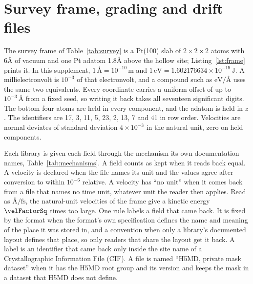 \documentclass[preprint,12pt]{elsarticle}
\begin{document}
\FloatBarrier \section{Survey frame, grading and drift files}\label{sec:supp-failure} The survey frame of Table~\ref{tab:survey} is a Pt(100) slab of \(2\times2\times2\) atoms with 6\hspace*{.2em}\AA{} of vacuum and one Pt adatom 1.8\hspace*{.2em}\AA{} above the hollow site; Listing~\ref{lst:frame} prints it.
In this supplement, \(1\,\text{\AA}=10^{-10}\,\mathrm{m}\) and \(1\,\mathrm{eV}=1.602176634\times10^{-19}\,\mathrm{J}\).
A millielectronvolt is \(10^{-3}\) of that electronvolt, and a compound such as \(\mathrm{eV}/\text{\AA}\) uses the same two equivalents.
Every coordinate carries a uniform offset of up to \(10^{-3}\,\text{\AA}\) from a fixed seed, so writing it back takes all seventeen significant digits.
The bottom four atoms are held in every component, and the adatom is held in \(z\).
The identifiers are 17, 3, 11, 5, 23, 2, 13, 7 and 41 in row order.
Velocities are normal deviates of standard deviation \(4\times10^{-3}\) in the natural unit, zero on held components.

Each library is given each field through the mechanism its own documentation names, Table~\ref{tab:mechanisms}.
A field counts as kept when it reads back equal.
A velocity is declared when the file names its unit and the values agree after conversion to within \(10^{-6}\) relative.
A velocity has ``no unit'' when it comes back from a file that names no time unit, whatever unit the reader then applies.
Read as \(\text{\AA}/\mathrm{fs}\), the natural-unit velocities of the frame give a kinetic energy \(\velFactorSq\) times too large.
One rule labels a field that came back.
It is fixed by the format when the format's own specification defines the name and meaning of the place it was stored in, and a convention when only a library's documented layout defines that place, so only readers that share the layout get it back.
A label is an identifier that came back only inside the site name of a Crystallographic Information File (CIF).
A file is named ``H5MD, private mask dataset'' when it has the H5MD root group and its version and keeps the mask in a dataset that H5MD does not define.
\end{document}
